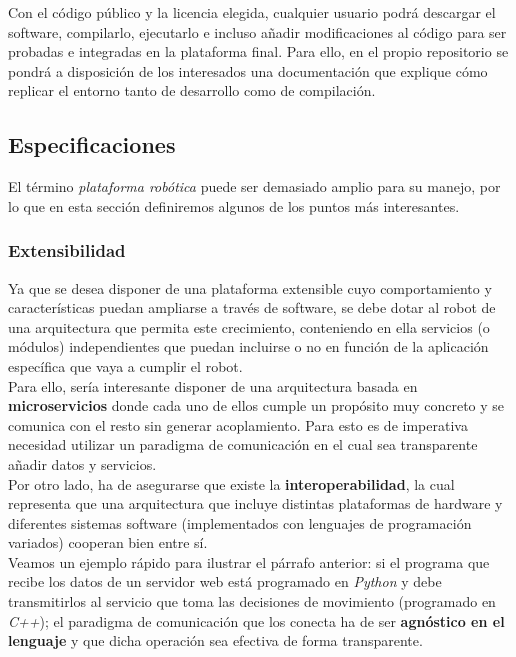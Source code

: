 Con el código público y la licencia elegida, cualquier usuario podrá descargar el software, compilarlo, ejecutarlo e incluso añadir modificaciones al código para ser probadas e integradas en la plataforma final. Para ello, en el propio repositorio se pondrá a disposición de los interesados una documentación que explique cómo replicar el entorno tanto de desarrollo como de compilación.\\


\subsection{Especificaciones}

El término \textit{plataforma robótica} puede ser demasiado amplio para su manejo, por lo que en esta sección definiremos algunos de los puntos más interesantes.

\subsubsection{Extensibilidad}

Ya que se desea disponer de una plataforma extensible cuyo comportamiento y características puedan ampliarse a través de software, se debe dotar al robot de una arquitectura que permita este crecimiento, conteniendo en ella servicios (o módulos) independientes que puedan incluirse o no en función de la aplicación específica que vaya a cumplir el robot.\\

Para ello, sería interesante disponer de una arquitectura basada en \textbf{microservicios} donde cada uno de ellos cumple un propósito muy concreto y se comunica con el resto sin generar acoplamiento. Para esto es de imperativa necesidad utilizar un paradigma de comunicación en el cual sea transparente añadir datos y servicios.\\

Por otro lado, ha de asegurarse que existe la \textbf{interoperabilidad}, la cual representa que una arquitectura que incluye distintas plataformas de hardware y diferentes sistemas software (implementados con lenguajes de programación variados) cooperan bien entre sí.\\

Veamos un ejemplo rápido para ilustrar el párrafo anterior: si el programa que recibe los datos de un servidor web está programado en \textit{Python} y debe transmitirlos al servicio que toma las decisiones de movimiento (programado en \textit{C++}); el paradigma de comunicación que los conecta ha de ser \textbf{agnóstico en el lenguaje} y que dicha operación sea efectiva de forma transparente.


